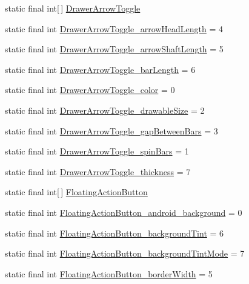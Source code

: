 \begin{DoxyCompactItemize}
\item 
static final int\mbox{[}$\,$\mbox{]} \hyperlink{classcheck_1_1test_1_1_r_1_1styleable_a3bd2348d01049d5d42d5b7f277abeec9}{Drawer\+Arrow\+Toggle}
\item 
static final int \hyperlink{classcheck_1_1test_1_1_r_1_1styleable_ac0647576f04a6d1d20c113fe5f620549}{Drawer\+Arrow\+Toggle\+\_\+arrow\+Head\+Length} = 4
\item 
static final int \hyperlink{classcheck_1_1test_1_1_r_1_1styleable_a5470f2b363de031a61f66e7cb6730f40}{Drawer\+Arrow\+Toggle\+\_\+arrow\+Shaft\+Length} = 5
\item 
static final int \hyperlink{classcheck_1_1test_1_1_r_1_1styleable_ad0c002a6830ad6d7027b2a71aaae6f7d}{Drawer\+Arrow\+Toggle\+\_\+bar\+Length} = 6
\item 
static final int \hyperlink{classcheck_1_1test_1_1_r_1_1styleable_aab0db7b5e25645f9ddc44b92a639dfa8}{Drawer\+Arrow\+Toggle\+\_\+color} = 0
\item 
static final int \hyperlink{classcheck_1_1test_1_1_r_1_1styleable_a4d2ffe9ec6395dfd049a6a31e683caea}{Drawer\+Arrow\+Toggle\+\_\+drawable\+Size} = 2
\item 
static final int \hyperlink{classcheck_1_1test_1_1_r_1_1styleable_a44d301c2d203c5db285393f8159327c4}{Drawer\+Arrow\+Toggle\+\_\+gap\+Between\+Bars} = 3
\item 
static final int \hyperlink{classcheck_1_1test_1_1_r_1_1styleable_a73da5fd0bc10c0ae2fa7bcb46d75899e}{Drawer\+Arrow\+Toggle\+\_\+spin\+Bars} = 1
\item 
static final int \hyperlink{classcheck_1_1test_1_1_r_1_1styleable_a3245f5a85d7d25f1960c495b486d78e6}{Drawer\+Arrow\+Toggle\+\_\+thickness} = 7
\item 
static final int\mbox{[}$\,$\mbox{]} \hyperlink{classcheck_1_1test_1_1_r_1_1styleable_ae6f501c03537511d2edaad8d699781da}{Floating\+Action\+Button}
\item 
static final int \hyperlink{classcheck_1_1test_1_1_r_1_1styleable_a72ad03dd3abdff80960d8174b01e6c87}{Floating\+Action\+Button\+\_\+android\+\_\+background} = 0
\item 
static final int \hyperlink{classcheck_1_1test_1_1_r_1_1styleable_a1f3f7c01b4b7fd997c371ce60234abad}{Floating\+Action\+Button\+\_\+background\+Tint} = 6
\item 
static final int \hyperlink{classcheck_1_1test_1_1_r_1_1styleable_a9a94417aa77b157ee8ca3ac5e289b662}{Floating\+Action\+Button\+\_\+background\+Tint\+Mode} = 7
\item 
static final int \hyperlink{classcheck_1_1test_1_1_r_1_1styleable_a170afde9a336204ba95ce5648ffd3a65}{Floating\+Action\+Button\+\_\+border\+Width} = 5

\end{DoxyCompactItemize}
